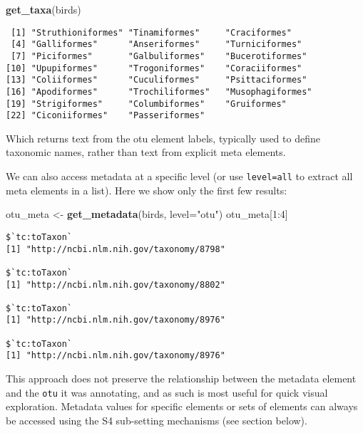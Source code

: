 \documentclass[author-year, review, 11pt]{components/elsarticle} %
\newenvironment{Shaded}{\begin{snugshade}}{\end{snugshade}}
\newcommand{\KeywordTok}[1]{\textcolor[rgb]{0.13,0.29,0.53}{\textbf{{#1}}}}
\newcommand{\DataTypeTok}[1]{\textcolor[rgb]{0.13,0.29,0.53}{{#1}}}
\newcommand{\DecValTok}[1]{\textcolor[rgb]{0.00,0.00,0.81}{{#1}}}
\newcommand{\StringTok}[1]{\textcolor[rgb]{0.31,0.60,0.02}{{#1}}}
\newcommand{\NormalTok}[1]{{#1}}
\begin{document}
\begin{Shaded}
\begin{Highlighting}[]
\KeywordTok{get_taxa}\NormalTok{(birds)}
\end{Highlighting}
\end{Shaded}

\begin{verbatim}
 [1] "Struthioniformes" "Tinamiformes"     "Craciformes"     
 [4] "Galliformes"      "Anseriformes"     "Turniciformes"   
 [7] "Piciformes"       "Galbuliformes"    "Bucerotiformes"  
[10] "Upupiformes"      "Trogoniformes"    "Coraciiformes"   
[13] "Coliiformes"      "Cuculiformes"     "Psittaciformes"  
[16] "Apodiformes"      "Trochiliformes"   "Musophagiformes" 
[19] "Strigiformes"     "Columbiformes"    "Gruiformes"      
[22] "Ciconiiformes"    "Passeriformes"   
\end{verbatim}

Which returns text from the otu element labels, typically used to define
taxonomic names, rather than text from explicit meta elements.

We can also access metadata at a specific level (or use
\texttt{level=all} to extract all meta elements in a list). Here we show
only the first few results:

\begin{Shaded}
\begin{Highlighting}[]
\NormalTok{otu_meta <-}\StringTok{ }\KeywordTok{get_metadata}\NormalTok{(birds, }\DataTypeTok{level=}\StringTok{"otu"}\NormalTok{)}
\NormalTok{otu_meta[}\DecValTok{1}\NormalTok{:}\DecValTok{4}\NormalTok{]}
\end{Highlighting}
\end{Shaded}

\begin{verbatim}
$`tc:toTaxon`
[1] "http://ncbi.nlm.nih.gov/taxonomy/8798"

$`tc:toTaxon`
[1] "http://ncbi.nlm.nih.gov/taxonomy/8802"

$`tc:toTaxon`
[1] "http://ncbi.nlm.nih.gov/taxonomy/8976"

$`tc:toTaxon`
[1] "http://ncbi.nlm.nih.gov/taxonomy/8976"
\end{verbatim}

This approach does not preserve the relationship between the metadata
element and the \texttt{otu} it was annotating, and as such is most
useful for quick visual exploration. Metadata values for specific
elements or sets of elements can always be accessed using the S4
sub-setting mechanisms (see section below).
\end{document}

